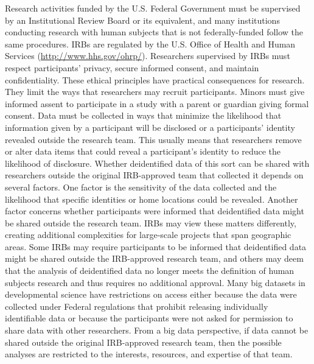 \documentclass[letterpaper,man,apacite,natbib]{apa6}
\begin{document}
Research activities funded by the U.S. Federal Government must be supervised by an Institutional Review Board or its equivalent, and many institutions conducting research with human subjects that is not federally-funded follow the same procedures.
IRBs are regulated by the U.S. Office of Health and Human Services (\url{http://www.hhs.gov/ohrp/}).
Researchers supervised by IRBs must respect participants' privacy, secure informed consent, and maintain confidentiality. 
These ethical principles have practical consequences for research.
They limit the ways that researchers may recruit participants.
Minors must give informed assent to participate in a study with a parent or guardian giving formal consent.
Data must be collected in ways that minimize the likelihood that information given by a participant will be disclosed or a participants' identity revealed outside the research team.
This usually means that researchers remove or alter data items that could reveal a participant's identity to reduce the likelihood of disclosure.
Whether deidentified data of this sort can be shared with researchers outside the original IRB-approved team that collected it depends on several factors.
One factor is the sensitivity of the data collected and the likelihood that specific identities or home locations could be revealed.
Another factor concerns whether participants were informed that deidentified data might be shared outside the research team.
IRBs may view these matters differently, creating additional complexities for large-scale projects that span geographic areas.
Some IRBs may require participants to be informed that deidentified data might be shared outside the IRB-approved research team, and others may deem that the analysis of deidentified data no longer meets the definition of human subjects research and thus requires no additional approval.
Many big datasets in developmental science have restrictions on access either because the data were collected under Federal regulations that prohibit releasing individually identifiable data or because the participants were not asked for permission to share data with other researchers.
From a big data perspective, if data cannot be shared outside the original IRB-approved research team, then the possible analyses are restricted to the interests, resources, and expertise of that team.
\end{document}

